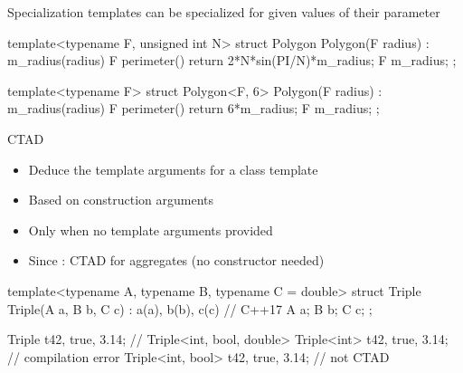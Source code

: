 \begin{frame}[fragile]
  \begin{block}{Specialization}
    templates can be specialized for given values of their parameter
  \end{block}
  \begin{cppcode*}{}
    template<typename F, unsigned int N>
    struct Polygon {
      Polygon(F radius) : m_radius(radius) {}
      F perimeter() {return 2*N*sin(PI/N)*m_radius;}
      F m_radius;
    };

    template<typename F>
    struct Polygon<F, 6> {
      Polygon(F radius) : m_radius(radius) {}
      F perimeter() {return 6*m_radius;}
      F m_radius;
    };
  \end{cppcode*}
\end{frame}

\begin{frame}[fragile]
  \begin{block}{CTAD}
    \begin{itemize}
    \item Deduce the template arguments for a class template
    \item Based on construction arguments
    \item Only when no template arguments provided
    \item Since : CTAD for aggregates (no constructor needed)
    \end{itemize}
  \end{block}
  \begin{cppcode*}{}
    template<typename A, typename B, typename C = double>
    struct Triple {
      Triple(A a, B b, C c) : a(a), b(b), c(c) {} // C++17
      A a; B b; C c;
    };

    Triple t{42, true, 3.14}; // Triple<int, bool, double>
    Triple<int> t{42, true, 3.14}; // compilation error
    Triple<int, bool> t{42, true, 3.14}; // not CTAD
  \end{cppcode*}
\end{frame}

